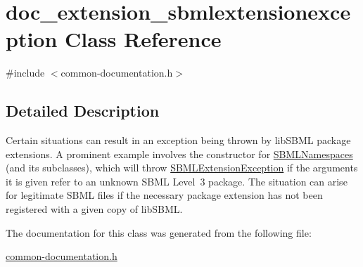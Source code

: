 \hypertarget{classdoc__extension__sbmlextensionexception}{}\section{doc\+\_\+extension\+\_\+sbmlextensionexception Class Reference}
\label{classdoc__extension__sbmlextensionexception}


{\ttfamily \#include $<$common-\/documentation.\+h$>$}



\subsection{Detailed Description}
\begin{DoxyParagraph}{}
Certain situations can result in an exception being thrown by lib\+S\+B\+ML package extensions. A prominent example involves the constructor for \hyperlink{class_s_b_m_l_namespaces}{S\+B\+M\+L\+Namespaces} (and its subclasses), which will throw \hyperlink{class_s_b_m_l_extension_exception}{S\+B\+M\+L\+Extension\+Exception} if the arguments it is given refer to an unknown S\+B\+ML Level~3 package. The situation can arise for legitimate S\+B\+ML files if the necessary package extension has not been registered with a given copy of lib\+S\+B\+ML. 
\end{DoxyParagraph}


The documentation for this class was generated from the following file\+:\begin{DoxyCompactItemize}
\item 
\hyperlink{common-documentation_8h}{common-\/documentation.\+h}\end{DoxyCompactItemize}
